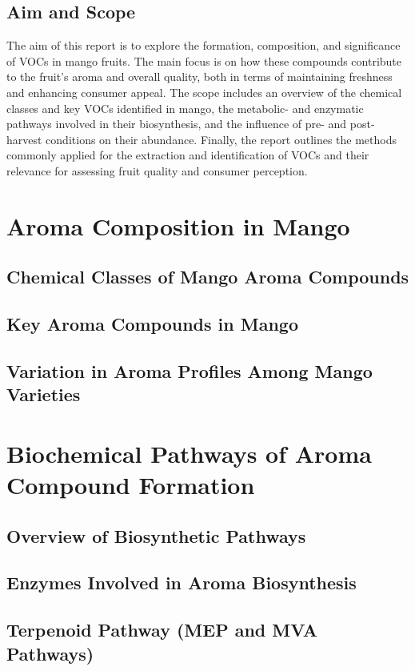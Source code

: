 \subsection{Aim and Scope}
The aim of this report is to explore the formation, composition, and significance of VOCs in mango fruits. The main focus is on how these compounds contribute to the fruit's aroma and overall quality, both in terms of maintaining freshness and enhancing consumer appeal.
The scope includes an overview of the chemical classes and key VOCs identified in mango, the metabolic- and enzymatic pathways involved in their biosynthesis, and the influence of pre- and post-harvest conditions on their abundance. Finally, the report outlines the methods commonly applied for the extraction and identification of VOCs and their relevance for assessing fruit quality and consumer perception.


\section{Aroma Composition in Mango}
\subsection{Chemical Classes of Mango Aroma Compounds}
\subsection{Key Aroma Compounds in Mango}
\subsection{Variation in Aroma Profiles Among Mango Varieties}


\section{Biochemical Pathways of Aroma Compound Formation}
\subsection{Overview of Biosynthetic Pathways}
\subsection{Enzymes Involved in Aroma Biosynthesis}
\subsection{Terpenoid Pathway (MEP and MVA Pathways)}
